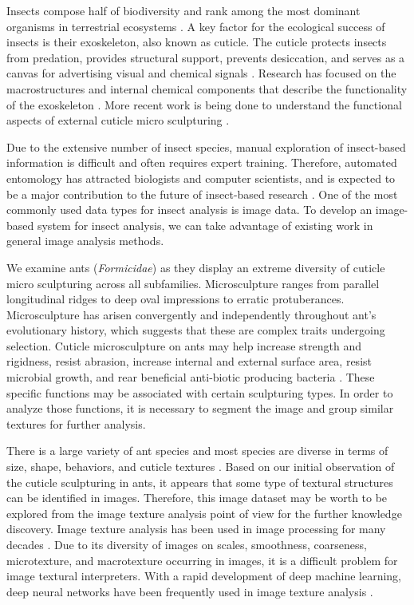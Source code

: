 \documentclass{aci}
\numberwithin{equation}{section}
\begin{document}
Insects compose half of biodiversity and rank among the most dominant organisms
in terrestrial ecosystems \cite{sheikh_diverse_2017}. A key factor for the
ecological success of insects is their exoskeleton, also known as cuticle. The
cuticle protects insects from predation, provides structural support, prevents
desiccation, and serves as a canvas for advertising visual and chemical signals
\cite{gullan_insects_2009}. Research has focused on the macrostructures and
internal chemical components that describe the functionality of the exoskeleton
\cite{gunderson_insect_1989}. More recent work is being done to understand the
functional aspects of external cuticle micro sculpturing
\cite{muthukrishnan_insect_2020, watson_diversity_2017}.

Due to the extensive number of insect species, manual exploration of
insect-based information is difficult and often requires expert training.
Therefore, automated entomology has attracted biologists and computer
scientists, and is expected to be a major contribution to the future of
insect-based research \cite{martineau_survey_2017}. One of the most commonly
used data types for insect analysis is image data. To develop an image-based
system for insect analysis, we can take advantage of existing work in general
image analysis methods.

We examine ants (\textit{Formicidae}) as they display an extreme diversity of
cuticle micro sculpturing across all subfamilies. Microsculpture ranges from
parallel longitudinal ridges to deep oval impressions to erratic protuberances.
Microsculpture has arisen convergently and independently throughout ant's
evolutionary history, which suggests  that these are complex traits undergoing
selection. Cuticle microsculpture on ants may help increase strength and
rigidness, resist abrasion, increase internal and external surface area, resist
microbial growth, and rear beneficial anti-biotic producing bacteria
\cite{johnson_effect_2011, bruckner_relationship_2017, currie_coevolved_2006}.
These specific functions may be associated with certain sculpturing types. In
order to analyze those functions, it is necessary to segment the image and group
similar textures for further analysis.

There is a large variety of ant species and most species are diverse in terms of
size, shape, behaviors, and cuticle textures \cite{harris_glossary_1979}.
Based on our initial observation of the cuticle sculpturing in ants, it appears
that some type of textural structures can be identified in images. Therefore,
this image dataset may be worth to be explored from the image texture analysis
point of view for the further knowledge discovery. Image texture analysis has
been used in image processing for many decades \cite{hung_image_2019}. Due to its
diversity of images on scales, smoothness, coarseness, microtexture, and
macrotexture occurring in images, it is a difficult problem for image textural
interpreters. With a rapid development of deep machine learning, deep neural
networks have been frequently used in image texture analysis
\cite{sun_robust_2014,liu_bow_2019,liu_pestnet_2019}.
\end{document}
